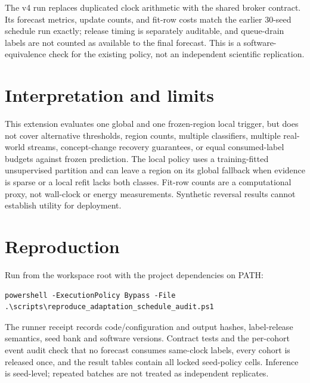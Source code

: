 \documentclass[10pt]{article}
\begin{document}
The v4 run replaces duplicated clock arithmetic with the shared broker contract. Its forecast metrics, update counts, and fit-row costs match the earlier 30-seed schedule run exactly; release timing is separately auditable, and queue-drain labels are not counted as available to the final forecast. This is a software-equivalence check for the existing policy, not an independent scientific replication.

\FloatBarrier
\section{Interpretation and limits}
This extension evaluates one global and one frozen-region local trigger, but does not cover alternative thresholds, region counts, multiple classifiers, multiple real-world streams, concept-change recovery guarantees, or equal consumed-label budgets against frozen prediction. The local policy uses a training-fitted unsupervised partition and can leave a region on its global fallback when evidence is sparse or a local refit lacks both classes. Fit-row counts are a computational proxy, not wall-clock or energy measurements. Synthetic reversal results cannot establish utility for deployment.

\section{Reproduction}
Run from the workspace root with the project dependencies on PATH:
\begin{verbatim}
powershell -ExecutionPolicy Bypass -File .\scripts\reproduce_adaptation_schedule_audit.ps1
\end{verbatim}
The runner receipt records code/configuration and output hashes, label-release semantics, seed bank and software versions. Contract tests and the per-cohort event audit check that no forecast consumes same-clock labels, every cohort is released once, and the result tables contain all locked seed-policy cells. Inference is seed-level; repeated batches are not treated as independent replicates.
\end{document}
